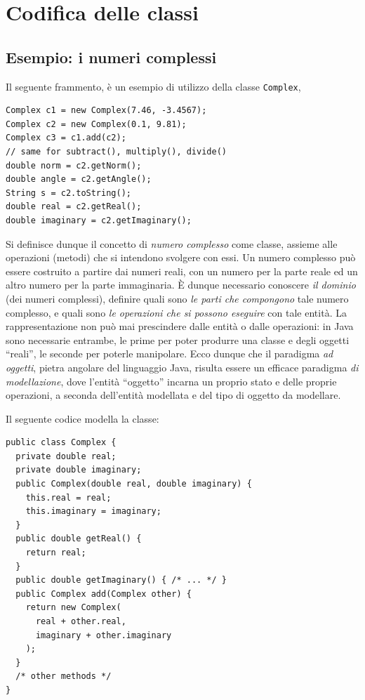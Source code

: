 \documentclass[\fontsizeclass,twocolumn]{\classname}
\theoremstyle{definition}
\theoremstyle{definition}
\begin{document}
\chapter{Codifica delle classi}

\section{Esempio: i numeri complessi}

Il seguente frammento, è un esempio di utilizzo della classe
\texttt{Complex},

\begin{lstlisting}
Complex c1 = new Complex(7.46, -3.4567);
Complex c2 = new Complex(0.1, 9.81);
Complex c3 = c1.add(c2);
// same for subtract(), multiply(), divide()
double norm = c2.getNorm();
double angle = c2.getAngle();
String s = c2.toString();
double real = c2.getReal();
double imaginary = c2.getImaginary();
\end{lstlisting}

Si definisce dunque il concetto di \emph{numero complesso} come classe, assieme
alle operazioni (metodi) che si intendono svolgere con essi. Un numero
complesso può essere costruito a partire dai numeri reali, con un numero per la
parte reale ed un altro numero per la parte immaginaria. È dunque necessario
conoscere \emph{il dominio} (dei numeri complessi), definire quali sono
\emph{le parti che compongono} tale numero complesso, e quali sono \emph{le
operazioni che si possono eseguire} con tale entità. La rappresentazione non
può mai prescindere dalle entità o dalle operazioni: in Java sono necessarie
entrambe, le prime per poter produrre una classe e degli oggetti ``reali'', le
seconde per poterle manipolare. Ecco dunque che il paradigma \emph{ad oggetti},
pietra angolare del linguaggio Java, risulta essere un efficace paradigma
\emph{di modellazione}, dove l'entità ``oggetto'' incarna un proprio stato e
delle proprie operazioni, a seconda dell'entità modellata e del tipo di oggetto
da modellare.

Il seguente codice modella la classe:

\begin{lstlisting}
public class Complex {
  private double real;
  private double imaginary;
  public Complex(double real, double imaginary) {
    this.real = real;
    this.imaginary = imaginary;
  }
  public double getReal() {
    return real;
  }
  public double getImaginary() { /* ... */ }
  public Complex add(Complex other) {
    return new Complex(
      real + other.real,
      imaginary + other.imaginary
    );
  }
  /* other methods */
}
\end{lstlisting}
\end{document}
